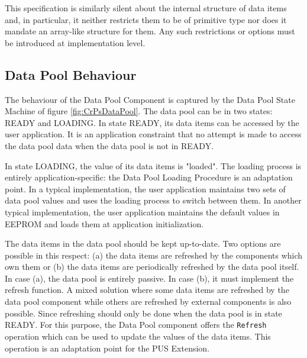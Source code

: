 \documentclass{pnp_article}
\begin{document}
This specification is similarly silent about the internal structure of data items and, in particular, it neither restricts them to be of primitive type nor does it mandate an array-like structure for them. Any such restrictions or options must be introduced at implementation level.

\subsection{Data Pool Behaviour}\label{sec:dpBehaviour}
The behaviour of the Data Pool Component is captured by the Data Pool State Machine of figure \ref{fig:CrPsDataPool}. The data pool can be in two states: READY and LOADING. In state READY, its data items can be accessed by the user application. It is an application constraint that no attempt is made to access the data pool data when the data pool is not in READY.

In state LOADING, the value of its data items is "loaded". The loading process is entirely application-specific: the Data Pool Loading Procedure is an adaptation point. In a typical implementation, the user application maintains two sets of data pool values and uses the loading process to switch between them. In another typical implementation, the user application maintains the default values in EEPROM and loads them at application initialization.


The data items in the data pool should be kept up-to-date. Two options are possible in this respect: (a) the data items are refreshed by the components which own them or (b) the data items are periodically refreshed by the data pool itself. In case (a), the data pool is entirely passive. In case (b), it must implement the refresh function. A mixed solution where some data items are refreshed by the data pool component while others are refreshed by external components is also possible. Since refreshing should only be done when the data pool is in state READY. For this purpose, the Data Pool component offers the \texttt{Refresh} operation which can be used to update the values of the data items. This operation is an adaptation point for the PUS Extension. 

\end{document}
